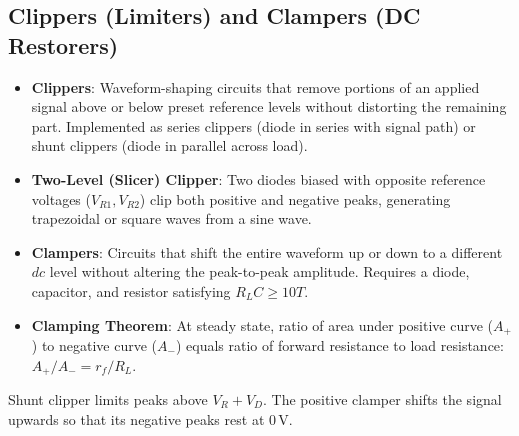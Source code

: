 \documentclass[12pt,a4paper]{article}
\begin{document}
\subsection{Clippers (Limiters) and Clampers (DC Restorers)}
\begin{itemize}[leftmargin=1.5em, itemsep=3pt]
  \item \textbf{Clippers}: Waveform-shaping circuits that remove portions of an applied signal above or below preset reference levels without distorting the remaining part. Implemented as series clippers (diode in series with signal path) or shunt clippers (diode in parallel across load).
  \item \textbf{Two-Level (Slicer) Clipper}: Two diodes biased with opposite reference voltages ($V_{R1}, V_{R2}$) clip both positive and negative peaks, generating trapezoidal or square waves from a sine wave.
  \item \textbf{Clampers}: Circuits that shift the entire waveform up or down to a different $dc$ level without altering the peak-to-peak amplitude. Requires a diode, capacitor, and resistor satisfying $R_L C \ge 10T$.
  \item \textbf{Clamping Theorem}: At steady state, ratio of area under positive curve ($A_+$) to negative curve ($A_-$) equals ratio of forward resistance to load resistance: $A_+ / A_- = r_f / R_L$.
\end{itemize}

\begin{tcolorbox}[tikzbox, unbreakable, title={Diode Clipper and Clamper Topologies}]
\centering
{}\par
\small Shunt clipper limits peaks above $V_R + V_D$. The positive clamper shifts the signal upwards so that its negative peaks rest at $0\,\mathrm{V}$.
\end{tcolorbox}
\end{document}
